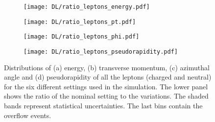 \begin{figure}[H]
    \centering
    \begin{subfigure}{0.49\textwidth}
        \centering
        \texttt{[image: DL/ratio\_leptons\_energy.pdf]}
        \caption{}
        \label{app:subfig:E(leptons)_DL}
    \end{subfigure}
    \begin{subfigure}{0.49\textwidth}
        \centering
        \texttt{[image: DL/ratio\_leptons\_pt.pdf]}
        \caption{}
        \label{app:subfig:pt(leptons)_DL}
    \end{subfigure}

    \vspace{0.2cm}
    
    \begin{subfigure}{0.49\textwidth}
        \centering
        \texttt{[image: DL/ratio\_leptons\_phi.pdf]}
        \caption{}
        \label{app:subfig:phi(leptons)_DL}
    \end{subfigure}
    \begin{subfigure}{0.49\textwidth}
        \centering
        \texttt{[image: DL/ratio\_leptons\_pseudorapidity.pdf]}
        \caption{}
        \label{app:subfig:eta(leptons)_DL}
    \end{subfigure}
    \caption{Distributions of (a) energy, (b) transverse momentum,  (c) azimuthal angle and (d) pseudorapidity of all the leptons (charged and neutral) for the six different settings used in the simulation. The lower panel shows the ratio of the nominal setting to the variations. The shaded bands represent statistical uncertainties. The last bins contain the overflow events.}
    \label{app:fig:leptons_DL}
\end{figure}


